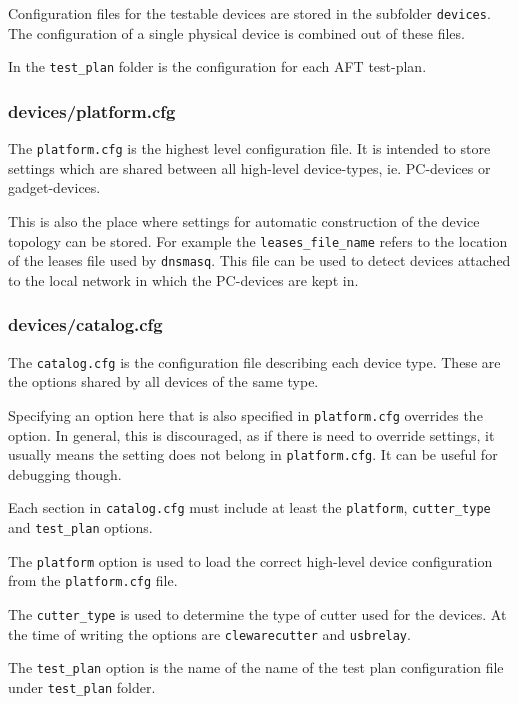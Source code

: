 \documentclass[a4paper,11pt]{article}
\newcommand{\cmd}[1]{\texttt{#1}}
\begin{document}
Configuration files for the testable devices are stored in the subfolder \cmd{devices}. The configuration of a single physical device is combined out of these files.

In the \cmd{test\_plan} folder is the configuration for each AFT test-plan.

\subsubsection*{devices/platform.cfg}
The \cmd{platform.cfg} is the highest level configuration file. It is intended to store settings which are shared between all high-level device-types, ie. PC-devices or gadget-devices.

This is also the place where settings for automatic construction of the device topology can be stored. For example the \cmd{leases\_file\_name} refers to the location of the leases file used by \cmd{dnsmasq}. This file can be used to detect devices attached to the local network in which the PC-devices are kept in.

\subsubsection*{devices/catalog.cfg}
The \cmd{catalog.cfg} is the configuration file describing each device type. These are the options shared by all devices of the same type.

Specifying an option here that is also specified in \cmd{platform.cfg} overrides the option. In general, this is discouraged, as if there is need to override settings, it usually means the setting does not belong in \cmd{platform.cfg}. It can be useful for debugging though.

Each section in \cmd{catalog.cfg} must include at least the \cmd{platform}, \cmd{cutter\_type} and \cmd{test\_plan} options.

The \cmd{platform} option is used to load the correct high-level device configuration from the \cmd{platform.cfg} file. 

The \cmd{cutter\_type} is used to determine the type of cutter used for the devices. At the time of writing the options are \cmd{clewarecutter} and \cmd{usbrelay}.

The \cmd{test\_plan} option is the name of the name of the test plan configuration file under \cmd{test\_plan} folder.
\end{document}
